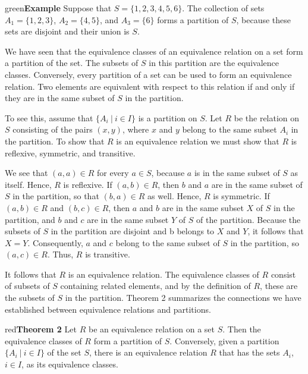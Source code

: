 \documentclass[11pt]{article}
\newenvironment{example}[1][\unskip]{\begin{mybox}{green}{\textbf{Example} {#1}}}{\end{mybox}}
\newenvironment{theorem}[1]{\begin{mybox}{red}{\textbf{Theorem #1}}}{\end{mybox}}
\begin{document}
\begin{example}
Suppose that $S = \{1, 2, 3, 4, 5, 6\}$. The collection of sets $A_1 = \{1, 2, 3\}$, $A_2 = \{4, 5\}$, and $A_3 = \{6\}$ forms a partition of $S$, because these sets are disjoint and their union is $S$.
\end{example}

We have seen that the equivalence classes of an equivalence relation on a set form a partition of the set. The subsets of $S$ in this partition are the equivalence classes. Conversely, every partition of a set can be used to form an equivalence relation. Two elements are equivalent with respect to this relation if and only if they are in the same subset of $S$ in the partition.

To see this, assume that $\{A_i\ |\ i \in I\}$ is a partition on $S$. Let $R$ be the relation on $S$ consisting of the pairs $(x, y)$, where $x$ and $y$ belong to the same subset $A_i$ in the partition. To show that $R$ is an equivalence relation we must show that $R$ is reflexive, symmetric, and transitive.

We see that $(a, a) \in R$ for every $a \in S$, because $a$ is in the same subset of $S$ as itself. Hence, $R$ is reflexive. If $(a, b) \in R$, then $b$ and $a$ are in the same subset of $S$ in the partition, so that $(b, a) \in R$ as well. Hence, $R$ is symmetric. If $(a, b) \in R$ and $(b, c) \in R$, then $a$ and $b$ are in the same subset $X$ of $S$ in the partition, and $b$ and $c$ are in the same subset $Y$ of $S$ of the partition. Because the subsets of $S$ in the partition are disjoint and b belongs to $X$ and $Y$, it follows that $X = Y$. Consequently, $a$ and $c$ belong to the same subset of $S$ in the partition, so $(a, c) \in R$. Thus, $R$ is transitive.

It follows that $R$ is an equivalence relation. The equivalence classes of $R$ consist of subsets of $S$ containing related elements, and by the definition of $R$, these are the subsets of $S$ in the partition. Theorem 2 summarizes the connections we have established between equivalence relations and partitions.

\begin{theorem}{2}
Let $R$ be an equivalence relation on a set $S$. Then the equivalence classes of $R$ form a partition of $S$. Conversely, given a partition $\{A_i\ |\ i \in I\}$ of the set $S$, there is an equivalence relation $R$ that has the sets $A_i$, $i \in I$, as its equivalence classes.
\end{theorem}
\end{document}
